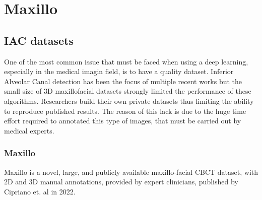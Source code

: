 
\chapter{Maxillo}

\label{chp:maxillo}

\def\:{\hskip0pt} %

\section{IAC datasets}
One of the most common issue that must be faced when using a deep learning,
especially in the medical imagin field, is to have a quality dataset. Inferior
Alveolar Canal detection has been the focus of multiple recent works but the
small size of 3D maxillofacial datasets strongly limited the performance of
these algorithms. Researchers build their own private datasets thus limiting the
ability to reproduce published results. The reason of this lack is due to the
huge time effort required to annotated this type of images, that must be carried
out by medical experts.

\subsection{Maxillo}
Maxillo is a novel, large, and publicly available maxillo-facial CBCT dataset,
with 2D and 3D manual annotations, provided by expert clinicians, published by
Cipriano et. al in 2022.

